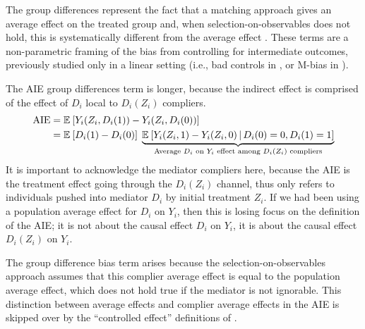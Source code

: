 The group differences represent the fact that a matching approach gives an average effect on the treated group and, when selection-on-observables does not hold, this is systematically different from the average effect \citep{heckman1998characterizing}.
These terms are a non-parametric framing of the bias from controlling for intermediate outcomes, previously studied only in a linear setting (i.e., bad controls in \citealt{cinelli2024crash}, or M-bias in \citealt{ding2015adjust}).

The AIE group differences term is longer, because the indirect effect is comprised of the effect of $D_i$ local to $D_i(Z_i)$ compliers.
\begin{align*}
    \text{AIE}
    &= \mathbb{E}_{} \left[ Y_i(Z_i, D_i(1)) - Y_i(Z_i, D_i(0)) \right] \\
    &= \mathbb{E}_{} \left[ D_i(1) - D_i(0) \right] \; 
        \underbrace{\mathbb{E}_{} \left[ Y_i(Z_i, 1) - Y_i(Z_i, 0) \, \middle\vert \, D_i(0)=0, D_i(1)=1 \right]}_{
            \text{Average $D_i$ on $Y_i$ effect among $D_i(Z_i)$ compliers}
        }
\end{align*}
It is important to acknowledge the mediator compliers here, because the AIE is the treatment effect going through the $D_i(Z_i)$ channel, thus only refers to individuals pushed into mediator $D_i$ by initial treatment $Z_i$.
If we had been using a population average effect for $D_i$ on $Y_i$, then this is losing focus on the definition of the AIE; it is not about the causal effect $D_i$ on $Y_i$, it is about the causal effect $D_i(Z_i)$ on $Y_i$.

The group difference bias term arises because the selection-on-observables approach assumes that this complier average effect is equal to the population average effect, which does not hold true if the mediator is not ignorable.
This distinction between average effects and complier average effects in the AIE is skipped over by the ``controlled effect'' definitions of \cite{pearl2003direct}.
